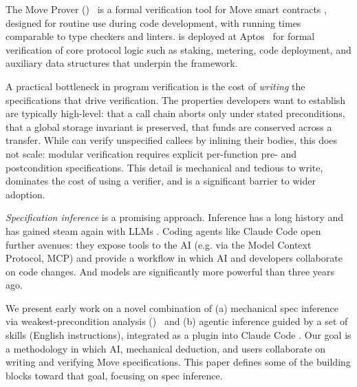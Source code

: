 \label{sec:intro}

The Move Prover (\MVP)~\cite{DillGPQXZ22} is a formal verification tool for Move smart contracts \cite{blackshear2020resources, MoveOnAptosBook}, designed for routine use during code development, with running times comparable to type checkers and linters.
\MVP is deployed at Aptos~\cite{ParkZGXGCLC24, TopoFrameworkBook} for formal verification of core protocol logic such as staking, metering, code deployment, and auxiliary data structures that underpin the framework.

%
A practical bottleneck in program verification is the cost of \emph{writing} the specifications that drive verification.
The properties developers want to establish are typically high-level: that a call chain aborts only under stated preconditions, that a global storage invariant is preserved, that funds are conserved across a transfer.
While \MVP can verify unspecified callees by inlining their bodies, this does not scale: modular verification requires explicit per-function pre- and postcondition specifications.
This detail is mechanical and tedious to write, dominates the cost of using a verifier, and is a significant barrier to wider adoption.

\emph{Specification inference} is a promising approach. Inference has a long history \cite{DaikonTSE01} and has gained steam again with LLMs \cite{PeiEtAl23, KamathEtAl23}.
Coding agents like Claude Code \cite{ClaudeCode} open further avenues: they expose tools to the AI (e.g. via the Model Context Protocol, MCP) and provide a workflow in which AI and developers collaborate on code changes. And models are significantly more powerful than three years ago.

We present early work on a novel combination of (a) mechanical spec inference via weakest-precondition analysis (\WP)~\cite{dijkstra1975wp,BL05} and (b) agentic inference guided by a set of skills (English instructions), integrated as a plugin into Claude Code \cite{ClaudeCodePlugins}.
Our goal is a methodology in which AI, mechanical deduction, and users collaborate on writing and verifying Move specifications.
This paper defines some of the building blocks toward that goal, focusing on spec inference.

